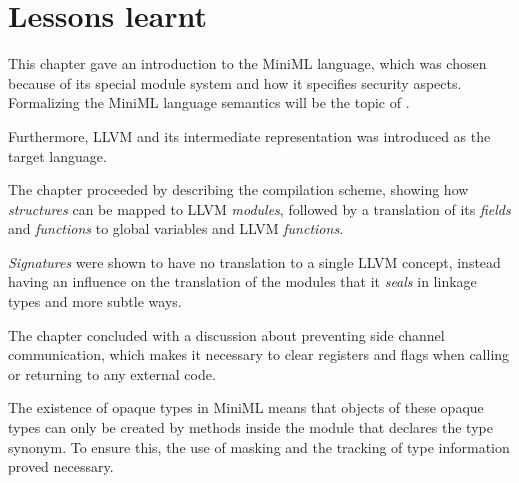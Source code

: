\section{Lessons learnt}

This chapter gave an introduction to the \mbox{MiniML} language, which was chosen because of its special module system and how it specifies security aspects. Formalizing the \mbox{MiniML} language semantics will be the topic of \label{chapter:formalspecification}.

Furthermore, LLVM and its intermediate representation was introduced as the target language.

The chapter proceeded by describing the compilation scheme, showing how \emph{structures} can be mapped to LLVM \emph{modules}, followed by a translation of its \emph{fields} and \emph{functions} to global variables and LLVM \emph{functions}.

\emph{Signatures} were shown to have no translation to a single LLVM concept, instead having an influence on the translation of the modules that it \emph{seals} in linkage types and more subtle ways.

The chapter concluded with a discussion about preventing side channel communication, which makes it necessary to clear registers and flags when calling or returning to any external code.

The existence of opaque types in \mbox{MiniML} means that objects of these opaque types can only be created by methods inside the module that declares the type synonym. To ensure this, the use of masking and the tracking of type information proved necessary.
